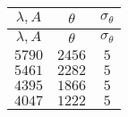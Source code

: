 \begin{tabular}{| c | c | c |}
\hline
$\lambda, A$ & $\theta$ & $\sigma_{\theta}$\\
\hline
$\lambda, A$ & $\theta$ & $\sigma_{\theta}$\\
\hline
$5790$ & $2456$ & $5$\\
\hline
$5461$ & $2282$ & $5$\\
\hline
$4395$ & $1866$ & $5$\\
\hline
$4047$ & $1222$ & $5$\\
\hline
\end{tabular}
